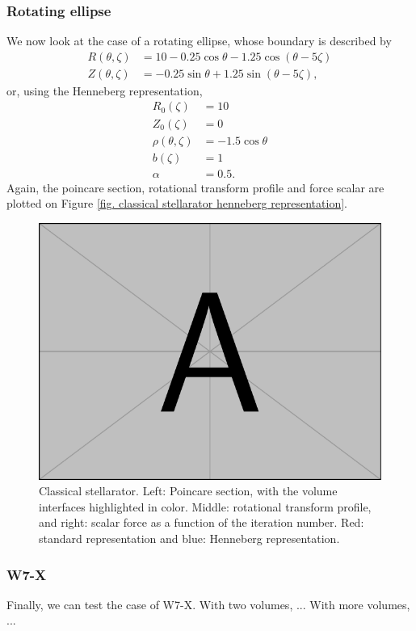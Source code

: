 \documentclass[my_thesis.tex]{subfiles}
\begin{document}
\subsubsection{Rotating ellipse}
We now look at the case of a rotating ellipse, whose boundary is described by
\begin{align}
	R(\theta,\zeta) &= 10 - 0.25\cos\theta - 1.25\cos(\theta-5\zeta)\\
	Z(\theta,\zeta) &= -0.25\sin\theta + 1.25\sin(\theta-5\zeta),
\end{align}
or, using the Henneberg representation, 
\begin{align}
	R_0(\zeta) &= 10\\
	Z_0(\zeta) &= 0\\
	\rho(\theta,\zeta) &= -1.5\cos\theta\\
	b(\zeta) &= 1\\
	\alpha &= 0.5.
\end{align}
Again, the poincare section, rotational transform profile and force scalar are plotted on Figure \ref{fig. classical stellarator henneberg representation}.

\begin{figure}
	\centering
	\includegraphics[width=\linewidth]{images/example-image-a.pdf}
	\caption{Classical stellarator. Left: Poincare section, with the volume interfaces highlighted in color. Middle: rotational transform profile, and right: scalar force as a function of the iteration number. Red: standard representation and blue: Henneberg representation.}
\end{figure}


\subsubsection{W7-X}
Finally, we can test the case of W7-X. With two volumes, ... With more volumes, ...
\end{document}
